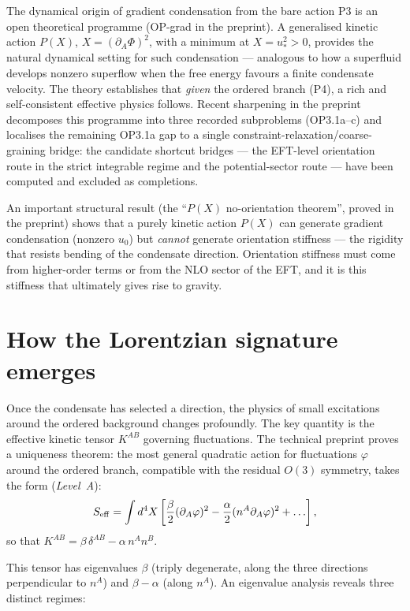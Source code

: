 \documentclass[11pt,a4paper]{article}
\begin{document}
The dynamical origin of gradient condensation from the bare action P3 is an open theoretical programme (OP-grad in the preprint). A generalised kinetic action $P(X)$, $X = (\partial_A\Phi)^2$, with a minimum at $X = u_*^2 > 0$, provides the natural dynamical setting for such condensation --- analogous to how a superfluid develops nonzero superflow when the free energy favours a finite condensate velocity. The theory establishes that \emph{given} the ordered branch (P4), a rich and self-consistent effective physics follows. Recent sharpening in the preprint decomposes this programme into three recorded subproblems (OP3.1a--c) and localises the remaining OP3.1a gap to a single constraint-relaxation/coarse-graining bridge: the candidate shortcut bridges --- the EFT-level orientation route in the strict integrable regime and the potential-sector route --- have been computed and excluded as completions.

An important structural result (the ``$P(X)$ no-orientation theorem'', proved in the preprint) shows that a purely kinetic action $P(X)$ can generate gradient condensation (nonzero $u_0$) but \emph{cannot} generate orientation stiffness --- the rigidity that resists bending of the condensate direction. Orientation stiffness must come from higher-order terms or from the NLO sector of the EFT, and it is this stiffness that ultimately gives rise to gravity.


\section{How the Lorentzian signature emerges}
\label{sec:pop_lorentzian}

Once the condensate has selected a direction, the physics of small excitations around the ordered background changes profoundly. The key quantity is the effective kinetic tensor $K^{AB}$ governing fluctuations. The technical preprint proves a uniqueness theorem: the most general quadratic action for fluctuations $\varphi$ around the ordered branch, compatible with the residual $O(3)$ symmetry, takes the form (\emph{Level~A}):
\begin{equation}
  S_{\rm eff} = \int d^4X \left[
  \frac{\beta}{2}(\partial_A\varphi)^2
  - \frac{\alpha}{2}(n^A\partial_A\varphi)^2
  + \ldots\right],
  \label{eq:pop_eft}
\end{equation}
so that
$K^{AB} = \beta\,\delta^{AB} - \alpha\,n^A n^B$.

This tensor has eigenvalues $\beta$ (triply degenerate, along the three directions perpendicular to $n^A$) and $\beta - \alpha$ (along $n^A$). An eigenvalue analysis reveals three distinct regimes:
\end{document}
